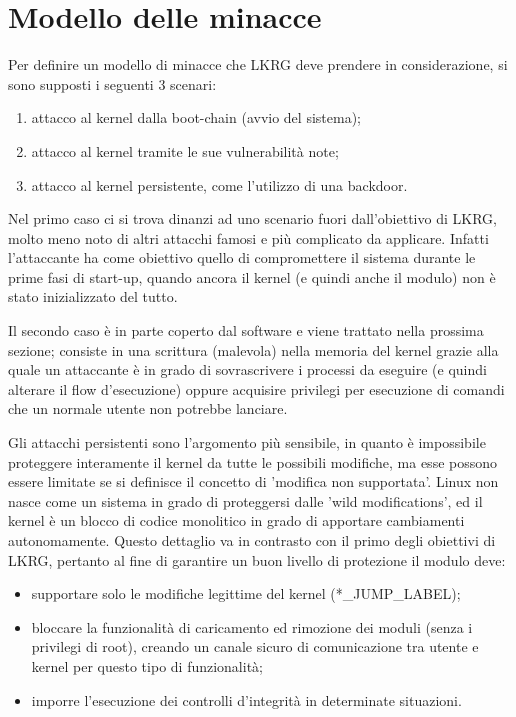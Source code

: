 \section{Modello delle minacce}

Per definire un modello di minacce che LKRG deve prendere in considerazione, si sono supposti i seguenti 3 scenari:

\begin{enumerate}
\item attacco al kernel dalla boot-chain (avvio del sistema);
\item attacco al kernel tramite le sue vulnerabilità note;
\item attacco al kernel persistente, come l'utilizzo di una backdoor.
\end{enumerate}

Nel primo caso ci si trova dinanzi ad uno scenario fuori dall'obiettivo di LKRG, molto meno noto di altri attacchi famosi e più complicato da applicare. Infatti l'attaccante ha come obiettivo quello di compromettere il sistema durante le prime fasi di start-up, quando ancora il kernel (e quindi anche il modulo) non è stato inizializzato del tutto.

Il secondo caso è in parte coperto dal software e viene trattato nella prossima sezione; consiste in una scrittura (malevola) nella memoria del kernel grazie alla quale un attaccante è in grado di sovrascrivere i processi da eseguire (e quindi alterare il flow d'esecuzione) oppure acquisire privilegi per esecuzione di comandi che un normale utente non potrebbe lanciare.

Gli attacchi persistenti sono l'argomento più sensibile, in quanto è impossibile proteggere interamente il kernel da tutte le possibili modifiche, ma esse possono essere limitate se si definisce il concetto di 'modifica non supportata'. Linux non nasce come un sistema in grado di proteggersi dalle 'wild modifications', ed il kernel è un blocco di codice monolitico in grado di apportare cambiamenti autonomamente. Questo dettaglio va in contrasto con il primo degli obiettivi di LKRG, pertanto al fine di garantire un buon livello di protezione il modulo deve:

\begin{itemize}
\item supportare solo le modifiche legittime del kernel (*\_JUMP\_LABEL);
\item bloccare la funzionalità di caricamento ed rimozione dei moduli (senza i privilegi di root), creando un canale sicuro di comunicazione tra utente e kernel per questo tipo di funzionalità;
\item imporre l'esecuzione dei controlli d'integrità in determinate situazioni.
\end{itemize}

